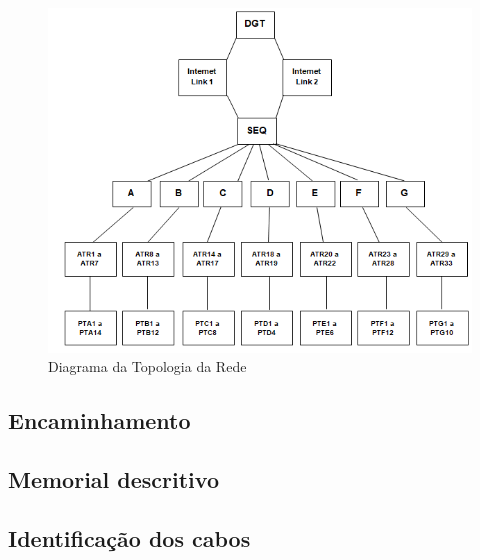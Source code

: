 \documentclass[	DIV=calc,%
							paper=a4,%
							fontsize=12pt,%
							onecolumn]{scrartcl}	 					%
\begin{document}

%
\begin{figure}[h!]
	\centering
	\includegraphics[width=\textwidth]{figura7.png}
	\caption[Diagrama da Topologia da Rede]{Diagrama da Topologia da Rede}
	\label{fig:figura7}
\end{figure}

\subsection{Encaminhamento}

\subsection{Memorial descritivo}


\subsection{Identificação dos cabos}
\end{document}
